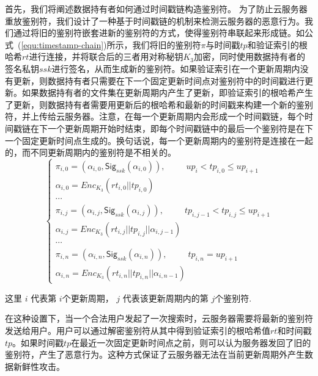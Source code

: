 首先，我们将阐述数据持有者如何通过时间戳链构造鉴别符。
为了防止云服务器重放鉴别符，我们设计了一种基于时间戳链的机制来检测云服务器的恶意行为。我们通过将旧的鉴别符嵌套进新的鉴别符的方式，使得鉴别符串联起来形成链。如公式~(\ref{equ:timestamp-chain})所示，我们将旧的鉴别符$\pi$与时间戳$tp$和验证索引的根哈希$rt$进行连接，并将联合后的三者用对称秘钥$K_3$加密，同时使用数据持有者的签名私钥$ssk$进行签名，从而生成新的鉴别符。如果验证索引在一个更新周期内没有更新，则数据持有者只需要在下一个固定更新时间点对鉴别符中的时间戳进行更新。如果数据持有者的文件集在更新周期内产生了更新，即验证索引的根哈希产生了更新，则数据持有者需要用更新后的根哈希和最新的时间戳来构建一个新的鉴别符，并上传给云服务器。注意，在每一个更新周期内会形成一个时间戳链，每个时间戳链在下一个更新周期开始时结束，即每个时间戳链中的最后一个鉴别符是在下一个固定更新时间点生成的。换句话说，每一个更新周期内的鉴别符是连接在一起的，而不同更新周期内的鉴别符是不相关的。
\vspace{-0.05in}
\begin{equation}
  \label{equ:timestamp-chain}
    \left\{
    \begin{array}{ll} %
      \pi_{i, 0} = (\alpha_{i, 0}, \mathsf{Sig}_{ssk}(\alpha_{i, 0})),~~~~~~~~~~~up_i < tp_{i, 0} \leq up_{i+1} \\
      \alpha_{i, 0} = Enc_{K_3}(rt_{i, 0}||tp_{i, 0}) \\
      \cdots \\

     \pi_{i, j} = (\alpha_{i, j}, \mathsf{Sig}_{ssk}(\alpha_{i, j})),~~~~~~~~~~~tp_{i, j-1} < tp_{i, j} \leq up_{i+1}  \\
     \alpha_{i, j} = Enc_{K_3}(rt_{i, j}||tp_{i, j}||\alpha_{i, j-1}) \\
      \cdots  \\
     \pi_{i, n} = (\alpha_{i, n}, \mathsf{Sig}_{ssk}(\alpha_{i, n})),~~~~~~~~~~~tp_{i, n}=up_{i+1} \\
     \alpha_{i, n} = Enc_{K_3}(rt_{i, n}||tp_{i, n}||\alpha_{i, n-1})
    \end{array}
    \right.
  \end{equation}

\noindent 这里 $i$ 代表第 $i$个更新周期， $j$ 代表该更新周期内的第 $j$个鉴别符.

在这种设置下，当一个合法用户发起了一次搜索时，云服务器需要将最新的鉴别符发送给用户。用户可以通过解密鉴别符从其中得到验证索引的根哈希值$rt$和时间戳$tp$。如果时间戳$tp$在最近一次固定更新时间点之前，则可以认为服务器发回了旧的鉴别符，产生了恶意行为。这种方式保证了云服务器无法在当前更新周期外产生数据新鲜性攻击。

